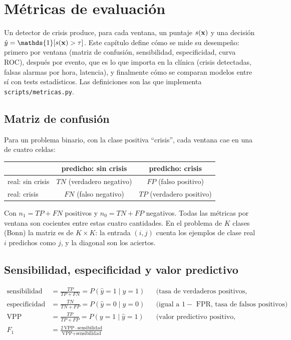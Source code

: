 \chapter{Métricas de evaluación}
\label{cap:metricas}

Un detector de crisis produce, para cada ventana, un puntaje $s(\mathbf{x})$ y una decisión
$\hat y = \mathds{1}[s(\vx) > \tau]$. Este capítulo define cómo se mide su desempeño: primero por ventana
(matriz de confusión, sensibilidad, especificidad, curva ROC), después por evento, que es lo que importa en la
clínica (crisis detectadas, falsas alarmas por hora, latencia), y finalmente cómo se comparan modelos entre sí con
tests estadísticos. Las definiciones son las que implementa \texttt{scripts/metricas.py}.

\section{Matriz de confusión}

Para un problema binario, con la clase positiva ``crisis'', cada ventana cae en una de cuatro celdas:
\begin{center}
\begin{tabular}{lcc}
\toprule
 & predicho: sin crisis & predicho: crisis \\
\midrule
real: sin crisis & $TN$ (verdadero negativo) & $FP$ (falso positivo) \\
real: crisis     & $FN$ (falso negativo)    & $TP$ (verdadero positivo) \\
\bottomrule
\end{tabular}
\end{center}
Con $n_1 = TP + FN$ positivos y $n_0 = TN + FP$ negativos. Todas las métricas por ventana son cocientes entre estas
cuatro cantidades. En el problema de $K$ clases (Bonn) la matriz es de $K \times K$: la entrada $(i,j)$ cuenta los
ejemplos de clase real $i$ predichos como $j$, y la diagonal son los aciertos.

\section{Sensibilidad, especificidad y valor predictivo}

\begin{align}
  \text{sensibilidad} &= \frac{TP}{TP + FN} = P(\hat y = 1 \mid y = 1) && \text{(tasa de verdaderos positivos, TPR)} \\
  \text{especificidad} &= \frac{TN}{TN + FP} = P(\hat y = 0 \mid y = 0) && \text{(igual a $1 - $ FPR, tasa de falsos positivos)} \\
  \text{VPP} &= \frac{TP}{TP + FP} = P(y = 1 \mid \hat y = 1) && \text{(valor predictivo positivo, precisión)} \\
  F_1 &= \frac{2\,\text{VPP}\cdot\text{sensibilidad}}{\text{VPP} + \text{sensibilidad}}
\end{align}

